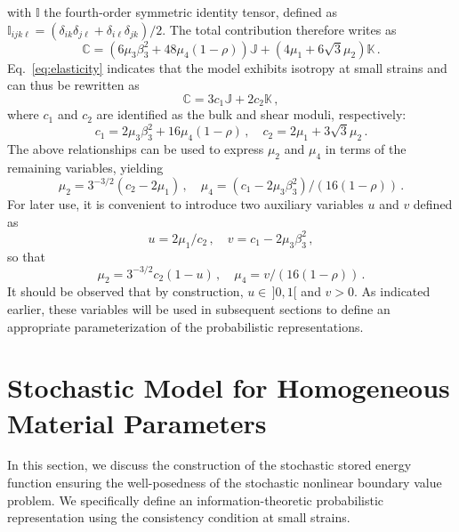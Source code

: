 with $\mathbb{I}$ the fourth-order symmetric identity tensor, defined as $\mathbb{I}_{ijk\ell} = (\delta_{ik}\delta_{j\ell}+\delta_{i\ell}\delta_{jk})/2$. The total contribution therefore writes as
\begin{equation}
    \mathbb{C} = (6 \mu_3 \beta_3^2+48 \mu_4(1 - \rho))\mathbb{J} + (4\mu_1+6\sqrt{3}\mu_2) \mathbb{K}\,. \label{eq:elasticity}
\end{equation}
Eq.~\eqref{eq:elasticity} indicates that the model exhibits isotropy at small strains and can thus be rewritten as
\begin{equation}
    \mathbb{C} = 3 c_1 \mathbb{J} + 2 c_2\mathbb{K}\,,
\end{equation}
where $c_1$ and $c_2$ are identified as the bulk and shear moduli, respectively:
\begin{equation}
    c_1 = 2 \mu_3 \beta_3^2+16\mu_4(1-\rho)\,,\quad c_2 = 2\mu_1+3\sqrt{3}\mu_2\,.
\end{equation}
The above relationships can be used to express $\mu_2$ and $\mu_4$ in terms of the remaining variables, yielding
\begin{equation}
     \mu_2 = 3^{-3/2}(c_2 - 2\mu_1)\,, \quad \mu_4 = (c_1 - 2 \mu_3 \beta_3^2)/\left(16(1-\rho)\right)\,.
\end{equation}
For later use, it is convenient to introduce two auxiliary variables $u$ and $v$ defined as
\begin{equation}
    u = 2\mu_1/c_2\,, \quad v = c_1 - 2 \mu_3 \beta_3^2\,,
\end{equation}
so that 
\begin{equation}
    \mu_2 = 3^{-3/2} c_2 (1 - u)\,, \quad \mu_4 = v/\left(16(1-\rho)\right)\,.
\end{equation}
It should be observed that by construction, $u \in \, ]0,1[$ and $v > 0$. As indicated earlier, these variables will be used in subsequent sections to define an appropriate parameterization of the probabilistic representations.

\section{Stochastic Model for Homogeneous Material Parameters}\label{sec:sto-homogeneous}


In this section, we discuss the construction of the stochastic stored energy function ensuring the well-posedness of the stochastic nonlinear boundary value problem. We specifically define an information-theoretic probabilistic representation using the consistency condition at small strains.

